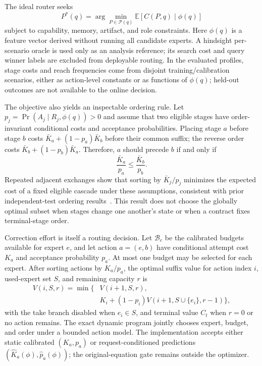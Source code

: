 The ideal router seeks
\begin{equation}
 P^*(q)=\arg\min_{P\in\mathcal{P}(q)}
 \mathbb{E}[C(P,q)\mid \phi(q)]
\label{eq:router-objective}
\end{equation}
subject to capability, memory, artifact, and role constraints. Here $\phi(q)$ is a
feature vector derived without running all candidate experts. A hindsight per-
scenario oracle is used only as an analysis reference; its search cost and query
winner labels are excluded from deployable routing. In the evaluated profiles, stage
costs and reach frequencies come from disjoint training/calibration scenarios, either
as action-level constants or as functions of $\phi(q)$; held-out outcomes are not
available to the online decision.

The objective also yields an inspectable ordering rule. Let
$p_j=\Pr(A_j\mid R_j,\phi(q))>0$ and assume that two eligible stages have
order-invariant conditional costs and acceptance probabilities. Placing stage $a$
before stage $b$ costs $\bar K_a+(1-p_a)\bar K_b$ before their common suffix; the
reverse order costs $\bar K_b+(1-p_b)\bar K_a$. Therefore, $a$ should precede $b$
if and only if
\begin{equation}
 \frac{\bar K_a}{p_a}\leq\frac{\bar K_b}{p_b}.
\label{eq:cascade-index}
\end{equation}
Repeated adjacent exchanges show that sorting by $\bar K_j/p_j$ minimizes the
expected cost of a fixed eligible cascade under these assumptions, consistent with
prior independent-test ordering results~\cite{berend2014tests}. This result
does not choose the globally optimal subset when stages change one another's state
or when a contract fixes terminal-stage order.

Correction effort is itself a routing decision. Let $\mathcal{B}_e$ be the
calibrated budgets available for expert $e$, and let action $a=(e,b)$ have
conditional attempt cost $K_a$ and acceptance probability $p_a$. At most one
budget may be selected for each expert. After sorting actions by $K_a/p_a$, the
optimal suffix value for action index $i$, used-expert set $S$, and remaining
capacity $r$ is
\begin{equation}
\begin{aligned}
 V(i,S,r)=\min\{&V(i+1,S,r),\\
 &K_i+(1-p_i)V(i+1,S\cup\{e_i\},r-1)\},
\end{aligned}
\label{eq:joint-route-budget}
\end{equation}
with the take branch disabled when $e_i\in S$, and terminal value $C_t$ when
$r=0$ or no action remains. The exact dynamic program jointly chooses expert, budget,
and order under a bounded action model. The implementation accepts either static
calibrated $(K_a,p_a)$ or request-conditioned predictions
$(\widehat K_a(\phi),\widehat p_a(\phi))$; the original-equation gate remains outside
the optimizer.

